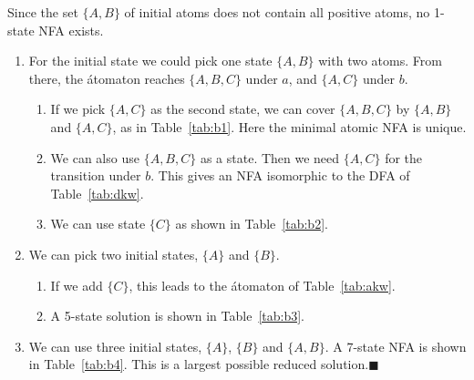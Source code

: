 \documentclass{llncs}
\newcommand{\be}{\begin{enumerate}}
\newcommand{\ee}{\end{enumerate}}
\newcommand{\qedb}{\hfill$\blacksquare$}
\begin{document}
\begin{example}
Since the set $\{A,B\}$ of initial atoms does not contain all positive atoms, no 1-state NFA exists.
\be
\item 
For the initial state we could pick one state $\{A,B\}$ with two atoms.  From there, the \'atomaton reaches 
$\{A,B,C\}$ under $a$, and  $\{A,C\}$ under $b$. 
        \be
        \item
If we pick $\{A,C\}$
as the second state,  we can cover $\{A,B,C\}$ by $\{A,B\}$ and 
$\{A,C\}$, as  in Table~\ref{tab:b1}.
Here the minimal atomic NFA is unique.
        \item
        We can also use $\{A,B,C\}$ as a state. Then we need $\{A,C\}$
        for the transition under $b$. This gives an NFA  isomorphic to the DFA of Table~\ref{tab:dkw}.
        \item
        We can use state $\{C\}$
        as shown in Table~\ref{tab:b2}.
        \ee
\item
We can pick two initial states, $\{A\}$ and $\{B\}$. 
        \be
        \item
        If we add $\{C\}$, this leads to the  \'atomaton of Table~\ref{tab:akw}.
        \item
        A 5-state solution is shown in Table~\ref{tab:b3}.
        \ee
\item
We can use three initial states, $\{A\}$, $\{B\}$ and $\{A,B\}$. 
        A 7-state NFA is shown in  Table~\ref{tab:b4}. This 
           is a largest possible reduced solution.\qedb
\ee

\end{example}
\end{document}
